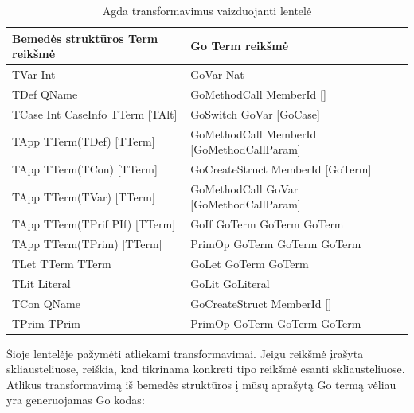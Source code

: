 \documentclass{VUMIFPSbakalaurinis}
\begin{document}
\begin{center}
	\begin{table}[h]
		\caption{Agda transformavimus vaizduojanti lentelė}
	\begin{tabular}{ |l|l| } 
	\hline
	\textbf{Bemedės struktūros Term reikšmė} & \textbf{Go Term reikšmė}  \\
	\hline
	TVar Int & GoVar Nat \\ 
	\hline
	TDef QName & GoMethodCall MemberId [] \\ 
	\hline
	TCase Int CaseInfo TTerm [TAlt] & GoSwitch GoVar [GoCase] \\ 
	\hline
	TApp TTerm(TDef) [TTerm] & GoMethodCall MemberId [GoMethodCallParam] \\ 
	\hline
	TApp TTerm(TCon) [TTerm] & GoCreateStruct MemberId [GoTerm] \\ 
	\hline
	TApp TTerm(TVar) [TTerm] & GoMethodCall GoVar [GoMethodCallParam] \\ 
	\hline
	TApp TTerm(TPrif PIf) [TTerm] & GoIf GoTerm GoTerm GoTerm \\ 
	\hline
	TApp TTerm(TPrim) [TTerm] & PrimOp GoTerm GoTerm GoTerm \\ 
	\hline
	TLet TTerm TTerm & GoLet GoTerm GoTerm \\ 
	\hline
	TLit Literal & GoLit GoLiteral \\ 
	\hline
	TCon QName & GoCreateStruct MemberId [] \\ 
	\hline
	TPrim TPrim & PrimOp GoTerm GoTerm GoTerm \\ 
	\hline
	\end{tabular}
	\label{fig:goterm}
\end{table}
	\end{center}
	Šioje lentelėje pažymėti atliekami transformavimai. Jeigu reikšmė įrašyta skliausteliuose, reiškia, kad tikrinama konkreti tipo reikšmė esanti skliausteliuose. Atlikus transformavimą iš bemedės struktūros į mūsų aprašytą Go termą vėliau yra generuojamas Go kodas:
\end{document}
